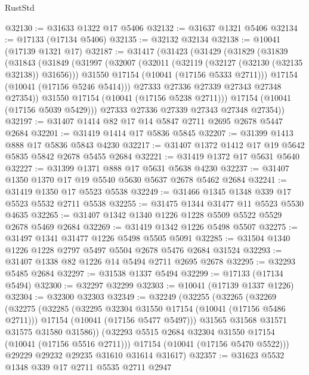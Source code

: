 \begin{lexlean}{RustStd}
\begin{coremodule}
@32130 := @31633 @1322 @17 @5406
@32132 := @31637 @1321 @5406
@32134 := @17133 (@17134 @5406)
@32135 := @32132 @32134
@32138 := @10041 (@17139 @1321 @17)
@32187 := @31417
    (@31423
      (@31429
        (@31829
          (@31839
            (@31843
              (@31849
                (@31997
                  (@32007
                    (@32011 (@32119 (@32127 (@32130 (@32135 @32138)) @31656)))
                    @31550
                    @17154
                    (@10041 (@17156 @5333 @2711)))
                  @17154
                  (@10041 (@17156 @5246 @5414)))
                @27333
                @27336
                @27339
                @27343
                @27348
                @27354))
            @31550
            @17154
            (@10041 (@17156 @5238 @2711)))
          @17154
          (@10041 (@17156 @5039 @5429)))
        @27333
        @27336
        @27339
        @27343
        @27348
        @27354))
@32197 := @31407 @1414 @82 @17 @14 @5847 @2711 @2695 @2678 @5447 @2684
@32201 := @31419 @1414 @17 @5836 @5845
@32207 := @31399 @1413 @888 @17 @5836 @5843 @4230
@32217 := @31407 @1372 @1412 @17 @19 @5642 @5835 @5842 @2678 @5455 @2684
@32221 := @31419 @1372 @17 @5631 @5640
@32227 := @31399 @1371 @888 @17 @5631 @5638 @4230
@32237 := @31407 @1350 @1370 @17 @19 @5540 @5630 @5637 @2678 @5462 @2684
@32241 := @31419 @1350 @17 @5523 @5538
@32249 := @31466 @1345 @1348 @339 @17 @5523 @5532 @2711 @5538
@32255 := @31475 @1344 @31477 @11 @5523 @5530 @4635
@32265 := @31407 @1342 @1340 @1226 @1228 @5509 @5522 @5529 @2678 @5469 @2684
@32269 := @31419 @1342 @1226 @5498 @5507
@32275 := @31497 @1341 @31477 @1226 @5498 @5505 @5091
@32285 := @31504 @1340 @1226 @1228 @2797 @5497 @5504 @2678 @5476 @2684 @31524
@32293 := @31407 @1338 @82 @1226 @14 @5494 @2711 @2695 @2678
@32295 := @32293 @5485 @2684
@32297 := @31538 @1337 @5494
@32299 := @17133 (@17134 @5494)
@32300 := @32297 @32299
@32303 := @10041 (@17139 @1337 @1226)
@32304 := @32300 @32303
@32349 := @32249
    (@32255
      (@32265
        (@32269
          (@32275
            (@32285
              (@32295 @32304 @31550 @17154 (@10041 (@17156 @5486 @2711)))
              @17154
              (@10041 (@17156 @5477 @5497)))
            @31565
            @31568
            @31571
            @31575
            @31580
            @31586))
        (@32293 @5515 @2684 @32304 @31550 @17154 (@10041 (@17156 @5516 @2711)))
        @17154
        (@10041 (@17156 @5470 @5522)))
      @29229
      @29232
      @29235
      @31610
      @31614
      @31617)
@32357 := @31623 @5532 @1348 @339 @17 @2711 @5535 @2711 @2947

\end{coremodule}
\end{lexlean}
